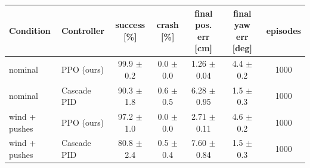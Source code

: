 \begin{tabular}{llccccc}\toprule
Condition & Controller & success [\%] & crash [\%] & final pos. err [cm] & final yaw err [deg] & episodes\\\midrule
nominal & PPO (ours) & 99.9 $\pm$ 0.2 & 0.0 $\pm$ 0.0 & 1.26 $\pm$ 0.04 & 4.4 $\pm$ 0.2 & 1000\\
nominal & Cascade PID & 90.3 $\pm$ 1.8 & 0.6 $\pm$ 0.5 & 6.28 $\pm$ 0.95 & 1.5 $\pm$ 0.3 & 1000\\
\midrule
wind + pushes & PPO (ours) & 97.2 $\pm$ 1.0 & 0.0 $\pm$ 0.0 & 2.71 $\pm$ 0.11 & 4.6 $\pm$ 0.2 & 1000\\
wind + pushes & Cascade PID & 80.8 $\pm$ 2.4 & 0.5 $\pm$ 0.4 & 7.60 $\pm$ 0.84 & 1.5 $\pm$ 0.3 & 1000\\
\bottomrule\end{tabular}

